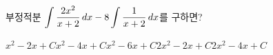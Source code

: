부정적분 $\displaystyle\int \dfrac{2x^2}{x+2}\mkern3mu dx-8\int \dfrac{1}{x+2}\mkern3mu dx$를 구하면? 
\begin{choicesii}{$x^2-2x+C$}{$x^2-4x+C$}{$x^2-6x+C$}{$2x^2-2x+C$}{$2x^2-4x+C$}\end{choicesii}
